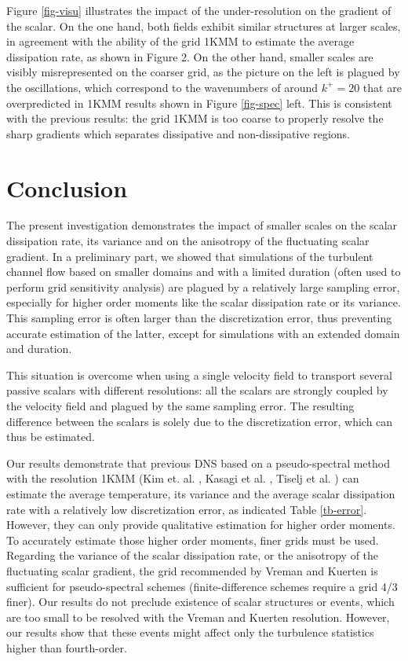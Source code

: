\documentclass[review]{elsarticle}
\begin{document}
Figure \ref{fig-visu} illustrates the impact of the under-resolution on the gradient of the scalar. On the one hand, both fields exhibit similar structures at larger scales, in agreement with the ability of the grid 1KMM to estimate the average dissipation rate, as shown in Figure 2. On the other hand, smaller scales are visibly misrepresented on the coarser grid, as the picture on the left is plagued by the oscillations, which correspond to the wavenumbers of around $k^+=20$ that are overpredicted in 1KMM results shown in Figure \ref{fig-spec} left. This is consistent with the previous results: the grid 1KMM is too coarse to properly resolve the sharp gradients which separates dissipative and non-dissipative regions.

\section{Conclusion}

The present investigation demonstrates the impact of smaller scales on the scalar dissipation rate, its variance and on the anisotropy of the fluctuating scalar gradient. In a preliminary part, we showed that simulations of the turbulent channel flow based on smaller domains and with a limited duration (often used to perform grid sensitivity analysis) are plagued by a relatively large sampling error, especially for higher order moments like the scalar dissipation rate or its variance. This sampling error is often larger than the discretization error, thus preventing accurate estimation of the latter, except for simulations with an extended domain and duration.

This situation is overcome when using a single velocity field to transport several passive scalars with different resolutions: all the scalars are strongly coupled by the velocity field and plagued by the same sampling error. The resulting difference between the scalars is solely due to the discretization error, which can thus be estimated.

Our results demonstrate that previous DNS based on a pseudo-spectral method with the resolution 1KMM (Kim et. al. \cite{kim1987turbulence}, Kasagi et al. \cite{kasagi1991direct}, Tiselj et al. \cite{tiselj2001effect}) can estimate the average temperature, its variance and the average scalar dissipation rate with a relatively low discretization error, as indicated Table \ref{tb-error}. However, they can only provide qualitative estimation for higher order moments. To accurately estimate those higher order moments, finer grids must be used. Regarding the variance of the scalar dissipation rate, or the anisotropy of the fluctuating scalar gradient, the grid recommended by Vreman and Kuerten \cite{vreman2014comparison} is sufficient for pseudo-spectral schemes (finite-difference schemes require a grid 4/3 finer). Our results do not preclude existence of scalar structures or events, which are too small to be resolved with the Vreman and Kuerten resolution. However, our results show that these events might affect only the turbulence statistics higher than fourth-order.
\end{document}
